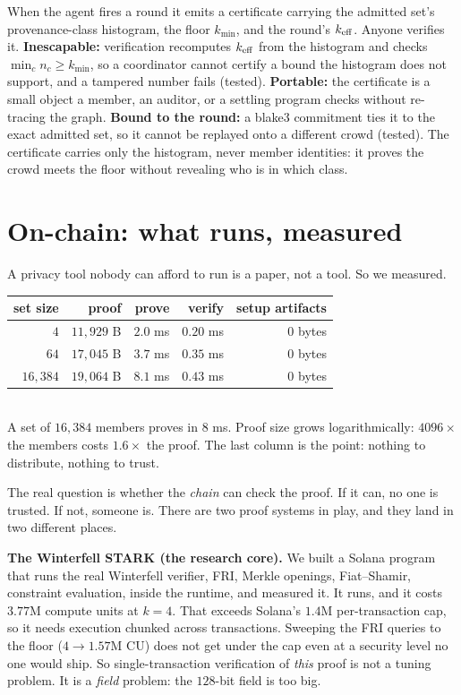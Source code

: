 \documentclass[11pt]{article}
\begin{document}
When the agent fires a round it emits a certificate carrying the admitted set's
provenance-class histogram, the floor $k_{\min}$, and the round's $k_{\mathrm{eff}}$. Anyone
verifies it. \textbf{Inescapable:} verification recomputes $k_{\mathrm{eff}}$ from the histogram and
checks $\min_c n_c \geq k_{\min}$, so a coordinator cannot certify a bound the histogram
does not support, and a tampered number fails (tested). \textbf{Portable:} the
certificate is a small object a member, an auditor, or a settling program checks without
re-tracing the graph. \textbf{Bound to the round:} a blake3 commitment ties it to the
exact admitted set, so it cannot be replayed onto a different crowd (tested). The
certificate carries only the histogram, never member identities: it proves the crowd
meets the floor without revealing who is in which class.

\section{On-chain: what runs, measured}
\label{sec:onchain}

A privacy tool nobody can afford to run is a paper, not a tool. So we measured.

\begin{measured}
\centering
\begin{tabular}{rrrrr}
\toprule
set size & proof & prove & verify & setup artifacts \\
\midrule
$4$        & $11{,}929$ B & $2.0$ ms & $0.20$ ms & $0$ bytes \\
$64$       & $17{,}045$ B & $3.7$ ms & $0.35$ ms & $0$ bytes \\
$16{,}384$ & $19{,}064$ B & $8.1$ ms & $0.43$ ms & $0$ bytes \\
\bottomrule
\end{tabular}\\[0.3em]
{\footnotesize A set of $16{,}384$ members proves in $8$ ms. Proof size grows
logarithmically: $4096\times$ the members costs $1.6\times$ the proof. The last column is
the point: nothing to distribute, nothing to trust.}
\end{measured}

The real question is whether the \emph{chain} can check the proof. If it can, no one is
trusted. If not, someone is. There are two proof systems in play, and they land in two
different places.

\textbf{The Winterfell STARK (the research core).} We built a Solana program that runs
the real Winterfell verifier, FRI, Merkle openings, Fiat--Shamir, constraint evaluation,
inside the runtime, and measured it. It runs, and it costs $3.77$M compute units at
$k{=}4$. That exceeds Solana's $1.4$M per-transaction cap, so it needs execution chunked
across transactions. Sweeping the FRI queries to the floor ($4{\to}1.57$M CU) does not
get under the cap even at a security level no one would ship. So single-transaction
verification of \emph{this} proof is not a tuning problem. It is a \emph{field} problem:
the $128$-bit field is too big.
\end{document}
